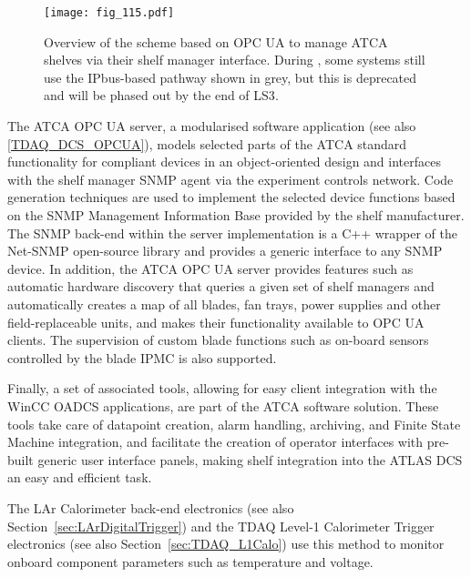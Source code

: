 \documentclass[cernpreprint, atlasdraft=false, UKenglish,british,orcidlogo, texmf, orcidlogo]{atlasdoc}
\begin{document}
\begin{figure}[!htb]
\centering	\texttt{[image: fig\_115.pdf]}
\caption{Overview of the scheme based on \gls{OPC UA} to manage \gls{ATCA} shelves via their shelf manager interface. During \RunThr, some systems still use the IPbus-based pathway shown in grey, but this is deprecated and will be phased out by the end of \gls{LS3}.
\label{fig:TDAQ_DCS_ATCAserver_overview}}
\end{figure}
 
The \gls{ATCA} \gls{OPC UA} server, a modularised software application
(see also \ref{TDAQ_DCS_OPCUA}), models selected parts of the \gls{ATCA} standard functionality for compliant devices in an object-oriented design 
and interfaces with the shelf manager \gls{SNMP} agent via the experiment controls network. Code generation techniques are used to implement the selected device functions based on the \gls{SNMP} Management Information Base provided by the shelf manufacturer. The \gls{SNMP} back-end within the server implementation is a C++ wrapper of the Net-\gls{SNMP} open-source library and provides a generic interface to any \gls{SNMP} device. In addition, the \gls{ATCA} \gls{OPC UA} server provides features such as automatic hardware discovery that queries a given set of shelf managers and automatically creates a map of all blades, fan trays, power supplies and other field-replaceable units, and makes their functionality available to \gls{OPC UA}  clients. The supervision of custom blade functions such as on-board sensors controlled by the blade \gls{IPMC} is also supported.
 
Finally, a set of associated tools, allowing for easy client integration with the  \gls{WinCC OA}\gls{DCS} applications, are part of the \gls{ATCA} software solution. These tools take care of datapoint creation, alarm handling, archiving, and Finite State Machine integration, and facilitate the creation of operator interfaces with pre-built generic user interface panels, making shelf integration into the ATLAS \gls{DCS} an easy and efficient task.
 
The \gls{LAr} Calorimeter back-end electronics (see also Section~\ref{sec:LArDigitalTrigger}) and the \gls{TDAQ} Level-1 Calorimeter Trigger electronics (see also Section~\ref{sec:TDAQ_L1Calo}) use this method to monitor onboard component parameters such as temperature and voltage.


 
\end{document}
